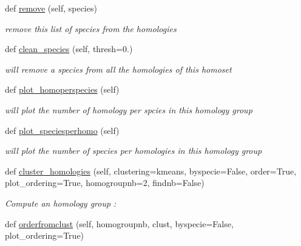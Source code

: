 \begin{DoxyCompactItemize}
def \mbox{\hyperlink{class_py_c_u_b_1_1homoset_1_1_homo_set_af19ffd1cceb4b222e642713456b300a1}{remove}} (self, species)
\begin{DoxyCompactList}\small\item\em remove this list of species from the homologies \end{DoxyCompactList}\item 
def \mbox{\hyperlink{class_py_c_u_b_1_1homoset_1_1_homo_set_a2062c7f9c3c956d43172e1688504826a}{clean\+\_\+species}} (self, thresh=0.)
\begin{DoxyCompactList}\small\item\em will remove a species from all the homologies of this homoset \end{DoxyCompactList}\item 
\mbox{\label{class_py_c_u_b_1_1homoset_1_1_homo_set_a2b4bf6cef1b2545373be7ef11c329796}} 
def \mbox{\hyperlink{class_py_c_u_b_1_1homoset_1_1_homo_set_a2b4bf6cef1b2545373be7ef11c329796}{plot\+\_\+homoperspecies}} (self)
\begin{DoxyCompactList}\small\item\em will plot the number of homology per spcies in this homology group \end{DoxyCompactList}\item 
\mbox{\label{class_py_c_u_b_1_1homoset_1_1_homo_set_a2cd71ff76ae8cd4ed1bdc206346942d4}} 
def \mbox{\hyperlink{class_py_c_u_b_1_1homoset_1_1_homo_set_a2cd71ff76ae8cd4ed1bdc206346942d4}{plot\+\_\+speciesperhomo}} (self)
\begin{DoxyCompactList}\small\item\em will plot the number of species per homologies in this homology group \end{DoxyCompactList}\item 
def \mbox{\hyperlink{class_py_c_u_b_1_1homoset_1_1_homo_set_a2d543ce742d6a4e968e14b1471319287}{cluster\+\_\+homologies}} (self, clustering=\textquotesingle{}kmeans\textquotesingle{}, byspecie=False, order=True, plot\+\_\+ordering=True, homogroupnb=2, findnb=False)
\begin{DoxyCompactList}\small\item\em Compute an homology group \+: \end{DoxyCompactList}\item 
def \mbox{\hyperlink{class_py_c_u_b_1_1homoset_1_1_homo_set_abebd6a9804b73a10fc726974630e5d26}{orderfromclust}} (self, homogroupnb, clust, byspecie=False, plot\+\_\+ordering=True)

\end{DoxyCompactItemize}
